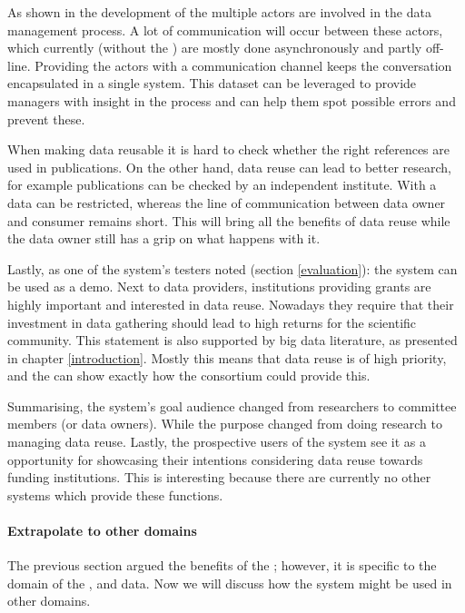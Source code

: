 As shown in the development of the \ivfsystem{} multiple actors are involved in the data management process.
A lot of communication will occur between these actors, which currently (without the \ivfsystem{}) are mostly done asynchronously and partly off-line.
Providing the actors with a communication channel keeps the conversation encapsulated in a single system.
This dataset can be leveraged to provide managers with insight in the process and can help them spot possible errors and prevent these.

When making data reusable it is hard to check whether  the right references are used in publications.
On the other hand, data reuse can lead to better research, for example publications can be checked by an independent institute.
With a \ivfsystem{} data can be restricted, whereas the line of communication between data owner and consumer remains short.
This will bring all the benefits of data reuse while the data owner still has a grip on what happens with it.

Lastly, as one of the system's testers noted (section \ref{evaluation}): the system can be used as a demo.
Next to data providers, institutions providing grants are highly important and interested in data reuse.
Nowadays they require that their investment in data gathering should lead to high returns for the scientific community.
This statement is also supported by big data literature, as presented in chapter \ref{introduction}.
Mostly this means that data reuse is of high priority, and the \ivfsystem{} can show exactly how the \project{} consortium could provide this.

Summarising, the system's goal audience changed from researchers to committee members (or data owners).
While the purpose changed from doing research to managing data reuse.
Lastly, the prospective users of the system see it as a opportunity for showcasing their intentions considering data reuse towards funding institutions.
This is interesting because there are currently no other systems which provide these functions.

\paragraph{Extrapolate to other domains}

The previous section argued the benefits of the \ivfsystem{}; however, it is specific to the domain of the \projectdata{}, \ie{} \IVF{} and \PRN{} data.
Now we will discuss how the system might be used in other domains.

